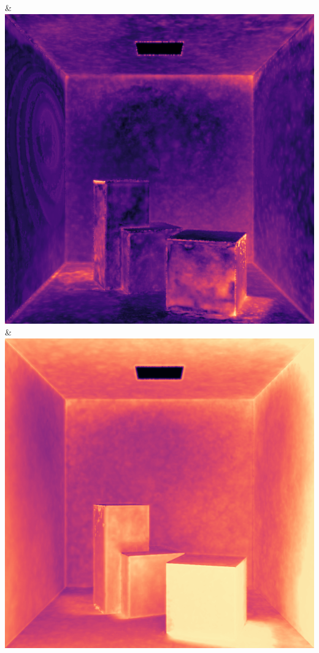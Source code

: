 & \includegraphics[width=\linewidth]{figures/py/tests/quality_comparison/nrc+pt_1spp_diffuse_flip.png}
& \includegraphics[width=\linewidth]{figures/py/tests/quality_comparison/nrc+pt+sl_1spp_diffuse_flip.png}
